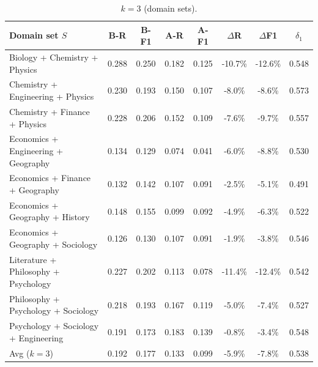 \begin{table}[!ht]
\small
\ContinuedFloat

\begin{subtable}[t]{\textwidth}
\caption{$k{=}3$ (domain sets).}
\centering
\begin{tabular}{lccccccc}
\toprule
Domain set $S$ &
B-R & B-F1 &
A-R & A-F1 &
$\Delta$R & $\Delta$F1 &
$\delta_1$ \\
\midrule
Biology + Chemistry + Physics                          & 0.288 & 0.250 & 0.182 & 0.125 & -10.7\% & -12.6\% & 0.548 \\
Chemistry + Engineering + Physics                      & 0.230 & 0.193 & 0.150 & 0.107 & -8.0\% & -8.6\% & 0.573 \\
Chemistry + Finance + Physics                          & 0.228 & 0.206 & 0.152 & 0.109 & -7.6\% & -9.7\% & 0.557 \\
Economics + Engineering + Geography                    & 0.134 & 0.129 & 0.074 & 0.041 & -6.0\% & -8.8\% & 0.530 \\
Economics + Finance + Geography                        & 0.132 & 0.142 & 0.107 & 0.091 & -2.5\% & -5.1\% & 0.491 \\
Economics + Geography + History                        & 0.148 & 0.155 & 0.099 & 0.092 & -4.9\% & -6.3\% & 0.522 \\
Economics + Geography + Sociology                      & 0.126 & 0.130 & 0.107 & 0.091 & -1.9\% & -3.8\% & 0.546 \\
Literature + Philosophy + Psychology                   & 0.227 & 0.202 & 0.113 & 0.078 & -11.4\% & -12.4\% & 0.542 \\
Philosophy + Psychology + Sociology                    & 0.218 & 0.193 & 0.167 & 0.119 & -5.0\% & -7.4\% & 0.527 \\
Psychology + Sociology + Engineering                   & 0.191 & 0.173 & 0.183 & 0.139 & -0.8\% & -3.4\% & 0.548 \\
\midrule
Avg ($k{=}3$) & 0.192 & 0.177 & 0.133 & 0.099 & -5.9\% & -7.8\% & 0.538 \\
\bottomrule
\end{tabular}
\end{subtable}


\end{table}
